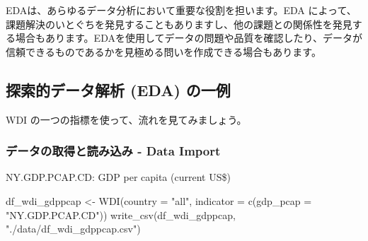 \documentclass[
]{bxjsbook}
\newenvironment{Shaded}{\begin{snugshade}}{\end{snugshade}}
\newcommand{\AttributeTok}[1]{\textcolor[rgb]{0.77,0.63,0.00}{#1}}
\newcommand{\FunctionTok}[1]{\textcolor[rgb]{0.00,0.00,0.00}{#1}}
\newcommand{\NormalTok}[1]{#1}
\newcommand{\OtherTok}[1]{\textcolor[rgb]{0.56,0.35,0.01}{#1}}
\newcommand{\StringTok}[1]{\textcolor[rgb]{0.31,0.60,0.02}{#1}}
\theoremstyle{definition}
\theoremstyle{definition}
\theoremstyle{definition}
\theoremstyle{definition}
\theoremstyle{remark}
\begin{document}
EDAは、あらゆるデータ分析において重要な役割を担います。EDA によって、課題解決のいとぐちを発見することもありますし、他の課題との関係性を発見する場合もあります。EDAを使用してデータの問題や品質を確認したり、データが信頼できるものであるかを見極める問いを作成できる場合もあります。

\hypertarget{ux63a2ux7d22ux7684ux30c7ux30fcux30bfux89e3ux6790-eda-ux306eux4e00ux4f8b}{%
\subsection{探索的データ解析 (EDA) の一例}\label{ux63a2ux7d22ux7684ux30c7ux30fcux30bfux89e3ux6790-eda-ux306eux4e00ux4f8b}}

WDI の一つの指標を使って、流れを見てみましょう。

\hypertarget{ux30c7ux30fcux30bfux306eux53d6ux5f97ux3068ux8aadux307fux8fbcux307f---data-import}{%
\subsubsection{データの取得と読み込み - Data Import}\label{ux30c7ux30fcux30bfux306eux53d6ux5f97ux3068ux8aadux307fux8fbcux307f---data-import}}

NY.GDP.PCAP.CD: GDP per capita (current US\$)

\begin{Shaded}
\begin{Highlighting}[]
\NormalTok{df\_wdi\_gdppcap }\OtherTok{\textless{}{-}} \FunctionTok{WDI}\NormalTok{(}\AttributeTok{country =} \StringTok{"all"}\NormalTok{, }\AttributeTok{indicator =} \FunctionTok{c}\NormalTok{(}\AttributeTok{gdp\_pcap =} \StringTok{"NY.GDP.PCAP.CD"}\NormalTok{))}
\FunctionTok{write\_csv}\NormalTok{(df\_wdi\_gdppcap, }\StringTok{"./data/df\_wdi\_gdppcap.csv"}\NormalTok{)}
\end{Highlighting}
\end{Shaded}
\end{document}

